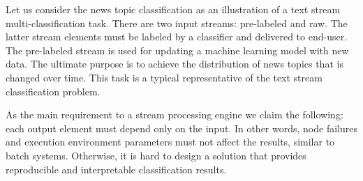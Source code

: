 \label {fs-short-problem}

Let us consider the news topic classification as an illustration of a text stream multi-classification task. There are two input streams: pre-labeled and raw. The latter stream elements must be labeled by a classifier and delivered to end-user. The pre-labeled stream is used for updating a machine learning model with new data. The ultimate purpose is to achieve the distribution of news topics that is changed over time. This task is a typical representative of the text stream classification problem.

As the main requirement to a stream processing engine we claim the following: each output element must depend only on the input. In other words, node failures and execution environment parameters must not affect the results, similar to batch systems. Otherwise, it is hard to design a solution that provides reproducible and interpretable classification results.